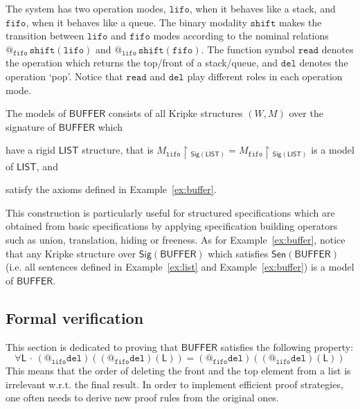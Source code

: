 \documentclass{article}
\makeatletter
\newcommand{\Sig}{\mathsf{Sig}}
\newcommand{\Sen}{\mathsf{Sen}}
\newcommand{\Lis}{\mathsf{L}}
\newcommand{\LIST}{{\mathsf{LIST}}}
\newcommand{\BUFFER}{{\mathsf{BUFFER}}}
\newcommand{\fifo}{{\mathtt{fifo}}}
\newcommand{\lifo}{{\mathtt{lifo}}}
\newcommand{\Read}{{\mathtt{read}}}
\newcommand{\del}{{\mathtt{del}}}
\newcommand{\shift}{{\mathtt{shift}}}
\newcommand{\red}{\!\upharpoonright\!\!}
\newcommand{\at}[1]{@_{#1}\,}
\newcommand{\Forall}[1]{\forall #1\,{\cdot}\,}
\newcounter{nr}
\makeatother
\begin{document}
 The system has two operation modes, $\lifo$, when it behaves like a stack, and $\fifo$, when it behaves like a queue. 
 The binary modality $\shift$ makes the transition between $\lifo$ and $\fifo$ modes according to the nominal relations $\at{\fifo}\underline{\shift}(\lifo)$ and $\at{\lifo}\underline{\shift}(\fifo)$.
 The function symbol $\Read$ denotes the operation which returns the top/front of a stack/queue, and $\del$ denotes the operation `pop'. 
 Notice that $\Read$ and $\del$ play different roles in each operation mode.
 
 The models of $\BUFFER$ consists of all Kripke structures $(W,M)$ over the signature of $\BUFFER$ which 
 \begin{enumerate*}[label=(\alph*)]
  \item have a rigid $\LIST$ structure, that is $M_\lifo\red_{\Sig(\LIST)}=M_\fifo\red_{\Sig(\LIST)}$ is a model of $\LIST$, and 
  
  \item satisfy the axioms defined in Example~\ref{ex:buffer}.
\end{enumerate*}
 This construction is particularly useful for structured specifications which are obtained from basic specifications by applying specification building operators such as union, translation, hiding or freeness.
 As for Example~\ref{ex:buffer}, notice that any Kripke structure over $\Sig(\BUFFER)$ which satisfies $\Sen(\BUFFER)$ (i.e. all sentences defined in Example~\ref{ex:list} and Example~\ref{ex:buffer}) is a model of $\BUFFER$.


\subsection{Formal verification}

 This section is dedicated to proving that  $\BUFFER$ satisfies the following property:
 $$ \Forall{\Lis}(@_\lifo\del)((@_\fifo\del)(\Lis))=(@_\fifo\del)((@_\lifo\del)(\Lis))$$
 This means that the order of deleting the front and the top element from a list is irrelevant w.r.t. the final result.
 In order to implement efficient proof strategies, one often needs to derive new proof rules from the original ones.

\end{document}
